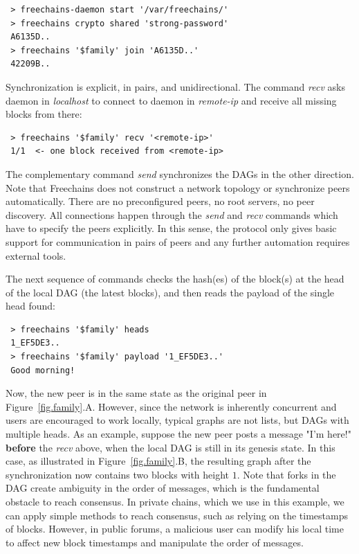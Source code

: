 \documentclass[10pt,journal,compsoc]{IEEEtran}
\newcommand{\FC}       {Freechains\xspace}
\begin{document}
{\footnotesize
\begin{verbatim}
 > freechains-daemon start '/var/freechains/'
 > freechains crypto shared 'strong-password'
 A6135D..
 > freechains '$family' join 'A6135D..'
 42209B..
\end{verbatim}
}

Synchronization is explicit, in pairs, and unidirectional.
The command \emph{recv} asks daemon in \emph{localhost} to connect to daemon in
\emph{remote-ip} and receive all missing blocks from there:

{\footnotesize
\begin{verbatim}
 > freechains '$family' recv '<remote-ip>'
 1/1  <- one block received from <remote-ip>
\end{verbatim}
}

The complementary command \emph{send} synchronizes the DAGs in the other
direction.
Note that \FC does not construct a network topology or synchronize peers
automatically.
There are no preconfigured peers, no root servers, no peer discovery.
All connections happen through the \emph{send} and \emph{recv} commands which
have to specify the peers explicitly.
In this sense, the protocol only gives basic support for communication in pairs
of peers and any further automation requires external tools.

The next sequence of commands checks the hash(es) of the block(s) at the head
of the local DAG (the latest blocks), and then reads the payload of the single
head found:

{\footnotesize
\begin{verbatim}
 > freechains '$family' heads
 1_EF5DE3..
 > freechains '$family' payload '1_EF5DE3..'
 Good morning!
\end{verbatim}
}

Now, the new peer is in the same state as the original peer in
Figure~\ref{fig.family}.A.
However, since the network is inherently concurrent and users are encouraged to
work locally, typical graphs are not lists, but DAGs with multiple heads.
As an example, suppose the new peer posts a message "I'm here!" \textbf{before}
the \emph{recv} above, when the local DAG is still in its genesis state.
In this case, as illustrated in Figure~\ref{fig.family}.B, the resulting graph
after the synchronization now contains two blocks with height $1$.
%
Note that forks in the DAG create ambiguity in the order of messages, which is
the fundamental obstacle to reach consensus.
In private chains, which we use in this example, we can apply simple methods to
reach consensus, such as relying on the timestamps of blocks.
However, in public forums, a malicious user can modify his local time to affect
new block timestamps and manipulate the order of messages.
\end{document}
